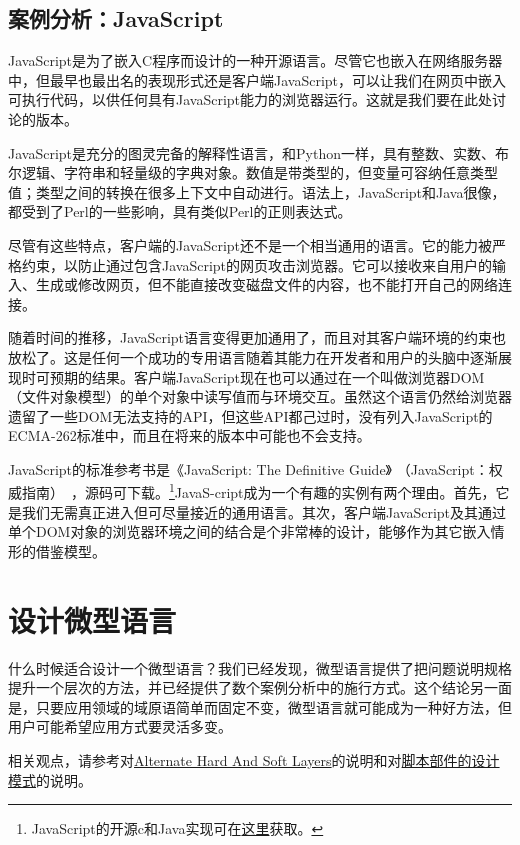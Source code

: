 \documentclass[12pt,oneside]{ctexbook}
\begin{document}
\begin{common-format}
\subsection{案例分析：JavaScript}
JavaScript是为了嵌入C程序而设计的一种开源语言。尽管它也嵌入在网络服务器中，但最早也最出名的表现形式还是客户端JavaScript，可以让我们在网页中嵌入可执行代码，以供任何具有JavaScript能力的浏览器运行。这就是我们要在此处讨论的版本。

JavaScript是充分的图灵完备的解释性语言，和Python一样，具有整数、实数、布尔逻辑、字符串和轻量级的字典对象。数值是带类型的，但变量可容纳任意类型值；类型之间的转换在很多上下文中自动进行。语法上，JavaScript和Java很像，都受到了Perl的一些影响，具有类似Perl的正则表达式。

尽管有这些特点，客户端的JavaScript还不是一个相当通用的语言。它的能力被严格约束，以防止通过包含JavaScript的网页攻击浏览器。它可以接收来自用户的输入、生成或修改网页，但不能直接改变磁盘文件的内容，也不能打开自己的网络连接。

随着时间的推移，JavaScript语言变得更加通用了，而且对其客户端环境的约束也放松了。这是任何一个成功的专用语言随着其能力在开发者和用户的头脑中逐渐展现时可预期的结果。客户端JavaScript现在也可以通过在一个叫做浏览器DOM（文件对象模型）的单个对象中读写值而与环境交互。虽然这个语言仍然给浏览器遗留了一些DOM无法支持的API，但这些API都己过时，没有列入JavaScript的ECMA-262标准中，而且在将来的版本中可能也不会支持。

JavaScript的标准参考书是《JavaScript: The Definitive Guide》 （JavaScript：权威指南）~\cite{FlanaganJavaScript}，源码可下载。\footnote{JavaScript的开源c和Java实现可在\href{http://www.mozilla.org/js/}{这里}获取。}JavaS-cript成为一个有趣的实例有两个理由。首先，它是我们无需真正进入但可尽量接近的通用语言。其次，客户端JavaScript及其通过单个DOM对象的浏览器环境之间的结合是个非常棒的设计，能够作为其它嵌入情形的借鉴模型。



\section{设计微型语言}
什么时候适合设计一个微型语言？我们已经发现，微型语言提供了把问题说明规格提升一个层次的方法，并已经提供了数个案例分析中的施行方式。这个结论另一面是，只要应用领域的域原语简单而固定不变，微型语言就可能成为一种好方法，但用户可能希望应用方式要灵活多变。

相关观点，请参考对\href{http://www.c2.com/cgi/wiki?AlternateHardAndSoftLayers}{Alternate  Hard  And  Soft  Layers}的说明和对\href{http://www.doc.ic.ac.uk/~np2/patterns/scripting/scripting.html}{脚本部件的设计模式}的说明。


\end{common-format}
\end{document}
